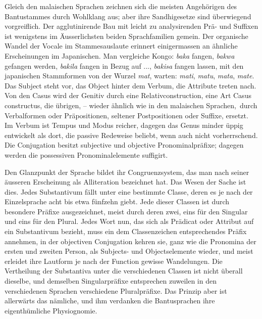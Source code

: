 Gleich den malaischen Sprachen zeichnen sich die meisten Angehörigen des Bantustammes durch Wohlklang aus; aber ihre Sandhigesetze sind überwiegend vorgreiflich. Der agglutinirende Bau mit leicht zu analysirenden Prä- und Suffixen ist wenigstens im Äusserlichsten beiden Sprachfamilien gemein. Der organische Wandel der Vocale im Stammesauslaute erinnert einigermassen an ähnliche Erscheinungen im Japanischen. Man vergleiche Kongo: \textit{baka} fangen, \textit{bakwa} gefangen werden, \textit{bakila} fangen in Bezug auf ..., \textit{bakisa} fangen lassen, mit den japanischen Stammformen von der Wurzel \textit{mat}, warten: \textit{mati}, \textit{matu}, \textit{mata}, \textit{mate}. Das Subject steht vor, das Object hinter dem Verbum, die Attribute treten nach. Von den Casus wird der Genitiv durch eine Relativconstruction, eine Art Casus constructus, die übrigen, – wieder ähnlich wie in den malaischen Sprachen\mbox{,  }durch Verbalformen oder Präpositionen, seltener Postpositionen oder Suffixe, ersetzt. Im Verbum ist Tempus und Modus reicher, dagegen das Genus minder üppig entwickelt als dort, die passive Redeweise beliebt, wenn auch nicht vorherrschend. Die Conjugation besitzt subjective und objective Pronominalpräfixe; dagegen werden die possessiven Pronominalelemente suffigirt.

Den Glanzpunkt der Sprache bildet ihr Congruenzsystem, das man nach seiner äusseren Erscheinung als Alliteration bezeichnet hat. Das Wesen der Sache ist dies. Jedes Substantivum fällt unter eine bestimmte Classe, deren es je nach der Einzelsprache acht bis etwa fünfzehn giebt. Jede dieser Classen ist durch besondere Präfixe ausgezeichnet, meist durch deren zwei, eins für den Singular und eins für den Plural. Jedes Wort nun, das sich als Prädicat oder Attribut auf ein Substantivum bezieht, muss ein dem Classenzeichen entsprechendes Präfix annehmen, in der objectiven Conjugation kehren sie, ganz wie die \label{sp.421} Pro\-\label{fp.400}nomina der ersten und zweiten Person, als Subjects- und Objectselemente wieder, und meist erleidet ihre Lautform je nach der Function gewisse Wandelungen. Die Vertheilung der Substantiva unter die verschiedenen Classen ist nicht überall dieselbe, und demselben Singularpräfixe entsprechen zuweilen in den verschiedenen Sprachen verschiedene Pluralpräfixe. Das Prinzip aber ist allerwärts das nämliche, und ihm verdanken die Bantusprachen ihre eigenthümliche Physiognomie. 

